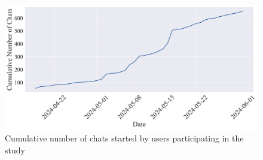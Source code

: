 \begin{figure}[H]
    \centering
    \includegraphics[width=1\textwidth]{results/plots/assets/usage-01-cumulative-number-of-chats.png}
    \caption{Cumulative number of chats started by users participating in the study}
    \label{fig:usage_01_cumulative_number_of_chats}
\end{figure}